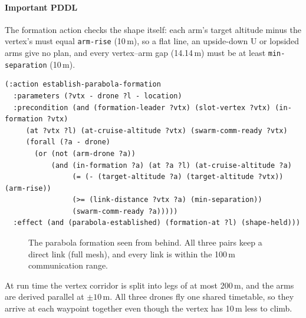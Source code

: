 \documentclass[11pt,a4paper,oneside]{report}
\newcommand{\code}[1]{\texttt{#1}}
\begin{document}
\paragraph{Important PDDL}
The formation action checks the shape itself: each arm's target altitude minus the vertex's must
equal \code{arm-rise} (10\,m), so a flat line, an upside-down U or lopsided arms give no plan,
and every vertex--arm gap (14.14\,m) must be at least \code{min-separation} (10\,m).

\begin{lstlisting}
(:action establish-parabola-formation
  :parameters (?vtx - drone ?l - location)
  :precondition (and (formation-leader ?vtx) (slot-vertex ?vtx) (in-formation ?vtx)
     (at ?vtx ?l) (at-cruise-altitude ?vtx) (swarm-comm-ready ?vtx)
     (forall (?a - drone)
       (or (not (arm-drone ?a))
           (and (in-formation ?a) (at ?a ?l) (at-cruise-altitude ?a)
                (= (- (target-altitude ?a) (target-altitude ?vtx)) (arm-rise))
                (>= (link-distance ?vtx ?a) (min-separation))
                (swarm-comm-ready ?a)))))
  :effect (and (parabola-established) (formation-at ?l) (shape-held)))
\end{lstlisting}

\begin{figure}[H]
\centering
{}
\caption[The parabola formation seen from behind]{The parabola formation seen from behind. All
three pairs keep a direct link (full mesh), and every link is within the 100\,m communication
range.}
\label{fig:parabola}
\end{figure}

\noindent At run time the vertex corridor is split into legs of at most 200\,m, and the arms are
derived parallel at $\pm10$\,m. All three drones fly one shared timetable, so they arrive at each
waypoint together even though the vertex has 10\,m less to climb.
\end{document}

